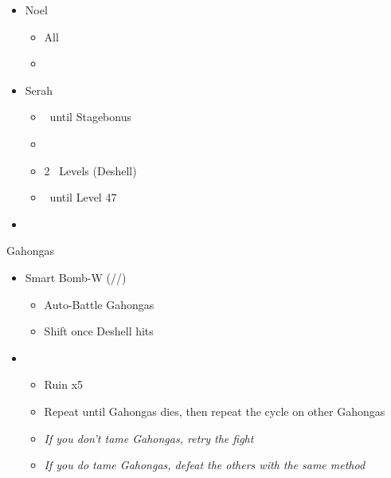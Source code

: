 \begin{menu}
\begin{itemize}
	\crystarium
	\begin{itemize}
		\item Noel
		\begin{itemize}
			\item All \rav
			\item {}
		\end{itemize}
		\item Serah
		\begin{itemize}
			\item \rav\ until Stagebonus
			\item \stagebonus{\sab}
			\item 2 \sab\ Levels (Deshell)
			\item \rav\ until Level 47
		\end{itemize}
	\end{itemize}
	\paradigm
	\begin{itemize}
		\item {}%
		{\paradigmline{\com}{\com}{\nek}{\X}}%
		{\paradigmline{\com}{\com}{\nek}{\W}}%
		{\paradigmline[3]{\textit{\rav}}{\textit{(\sab)}}{\textit{\nek}}{\textit{\W}}}%
		{\paradigmline{\sen}{\sen}{\nek}{\W}}%
		{\paradigmline{\rav}{\rav}{\nek}{\W}}%
		{\paradigmline{\rav}{\rav}{\nek}{\W}}
	\end{itemize}
\end{itemize}
\end{menu}

\renewcommand{\third}{[3] Smart Bomb-W (\rav/\sab/\nek)}
\begin{battle}{Gahongas}
\begin{itemize}
	\item \third
	\begin{itemize}
		\item Auto-Battle Gahongas
		\item Shift once Deshell hits
	\end{itemize}
	\item \first
	\begin{itemize}
		\item Ruin x5
		\item Repeat until Gahongas dies, then repeat the cycle on other Gahongas
		\item \textit{If you don't tame Gahongas, retry the fight}
		\item \textit{If you do tame Gahongas, defeat the others with the same method}
	\end{itemize}
\end{itemize}
\end{battle}


